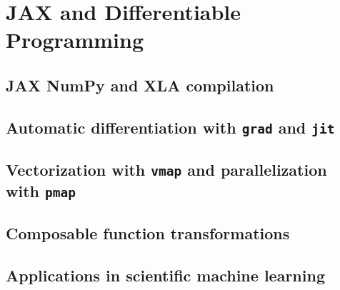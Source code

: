 \section{JAX and Differentiable Programming}
\subsection{JAX NumPy and XLA compilation}
\subsection{Automatic differentiation with \texttt{grad} and \texttt{jit}}
\subsection{Vectorization with \texttt{vmap} and parallelization with \texttt{pmap}}
\subsection{Composable function transformations}
\subsection{Applications in scientific machine learning}

